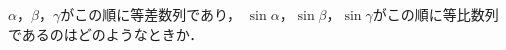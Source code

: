 \documentclass[../../main.tex]{subfiles}
\begin{document}
$\alpha$，$\beta$，$\gamma$がこの順に等差数列であり，
$\sin\alpha$，$\sin\beta$，$\sin\gamma$がこの順に等比数列であるのはどのようなときか．
\end{document}
